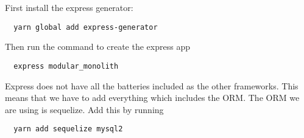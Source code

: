 First install the express generator:
\begin{verbatim}
  yarn global add express-generator
\end{verbatim}

Then run the command to create the express app
\begin{verbatim}
  express modular_monolith
\end{verbatim}

Express does not have all the batteries included as the other frameworks. This means that we have to add everything which includes the ORM. The ORM we are using is sequelize. Add this by running
\begin{verbatim}
  yarn add sequelize mysql2
\end{verbatim}